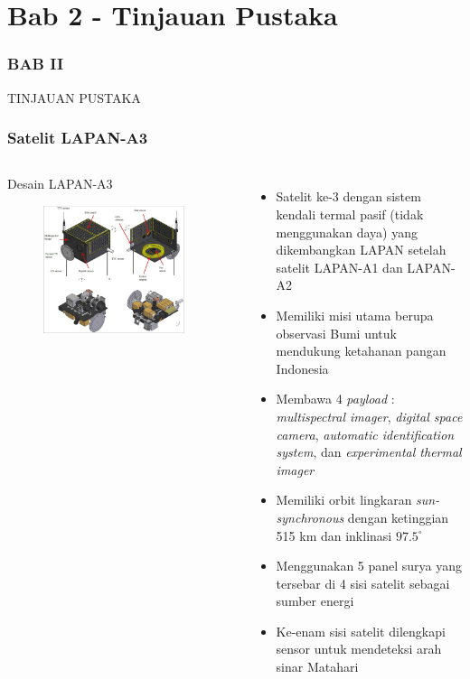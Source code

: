 \documentclass[8pt]{beamer}
\begin{document}
\section{Bab 2 - Tinjauan Pustaka}
\begin{frame}
  \frametitle{BAB II}
  \center \large TINJAUAN PUSTAKA
\end{frame}
\begin{frame}
  \frametitle{Satelit LAPAN-A3}
  \begin{columns}[T]
      \begin{block}{\center Desain LAPAN-A3}
      \begin{figure}
          \includegraphics[width=0.9\textwidth]{figure/a3overview.jpg}
      \end{figure}
      \end{block}
      \begin{itemize}
        \item Satelit ke-3 dengan sistem kendali termal pasif (tidak menggunakan daya) yang dikembangkan LAPAN setelah satelit LAPAN-A1 dan LAPAN-A2
        \item Memiliki misi utama berupa observasi Bumi untuk mendukung ketahanan pangan Indonesia
        \item Membawa 4 \textit{payload} : \textit{multispectral imager}, \textit{digital space camera}, \textit{automatic identification system}, dan \textit{experimental thermal imager} \cite{hartono2019}
        \item Memiliki orbit lingkaran \textit{sun-synchronous} dengan ketinggian 515 km dan inklinasi $97.5^\circ$
        \item Menggunakan 5 panel surya yang tersebar di 4 sisi satelit sebagai sumber energi
        \item Ke-enam sisi satelit dilengkapi sensor untuk mendeteksi arah sinar Matahari
      \end{itemize}
  \end{columns}
\end{frame}
\end{document}

